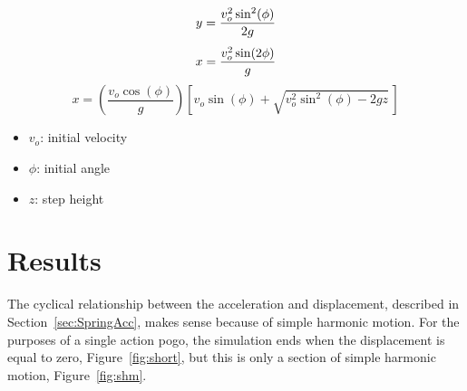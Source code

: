 \documentclass[12pt, letterpaper]{article}
\begin{document}
\begin{singlespace}
  \begin{equation}
    \label{eq:progHeight}
    y = \frac{v_o^2 \sin^2(\phi)}{2g} \\
  \end{equation}
  \begin{equation}
    \label{eq:progDistance}
    x = \frac{v_o^2 \sin(2\phi)}{g} \\
  \end{equation}
  \begin{equation}
    \label{eq:progStepDistance}
    x = (\frac{v_o \cos(\phi)}{g})[v_o \sin(\phi) + \sqrt{v_o^2 \sin^2(\phi)-2gz}\,]
  \end{equation}
  \begin{small}
    \begin{itemize}[label=]
      \item $v_o$: initial velocity
      \item $\phi$: initial angle
      \item $z$: step height
    \end{itemize}
  \end{small}
\end{singlespace}

\section{Results} \label{sec:Results}

The cyclical relationship between the acceleration and displacement, described in 
Section~\ref{sec:SpringAcc}, makes sense because of simple harmonic motion. For the purposes of a single
action pogo, the simulation ends when the displacement is equal to zero,
Figure~\ref{fig:short}, but this is only a section of simple harmonic motion, Figure~\ref{fig:shm}.
\end{document}
